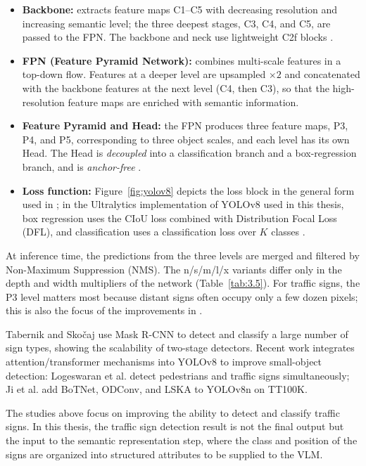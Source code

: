 \documentclass[12pt,a4paper]{report}
\begin{document}
\begin{itemize}
    \item \textbf{Backbone:} extracts feature maps C1--C5 with decreasing resolution and increasing semantic level; the three deepest stages, C3, C4, and C5, are passed to the FPN. The backbone and neck use lightweight C2f blocks \cite{sapkota2025yoloevolution}.
    \item \textbf{FPN (Feature Pyramid Network):} combines multi-scale features in a top-down flow. Features at a deeper level are upsampled $\times2$ and concatenated with the backbone features at the next level (C4, then C3), so that the high-resolution feature maps are enriched with semantic information.
    \item \textbf{Feature Pyramid and Head:} the FPN produces three feature maps, P3, P4, and P5, corresponding to three object scales, and each level has its own Head. The Head is \textit{decoupled} into a classification branch and a box-regression branch, and is \textit{anchor-free} \cite{sapkota2025yoloevolution}.
    \item \textbf{Loss function:} Figure~\ref{fig:yolov8} depicts the loss block in the general form used in \cite{sapkota2025yoloevolution}; in the Ultralytics implementation of YOLOv8 used in this thesis, box regression uses the CIoU loss combined with Distribution Focal Loss (DFL), and classification uses a classification loss over $K$ classes \cite{jocher2023yolov8}.
\end{itemize}

At inference time, the predictions from the three levels are merged and filtered by Non-Maximum Suppression (NMS). The n/s/m/l/x variants differ only in the depth and width multipliers of the network (Table~\ref{tab:3.5}). For traffic signs, the P3 level matters most because distant signs often occupy only a few dozen pixels; this is also the focus of the improvements in \cite{ji2024improvedyolov8}.

Tabernik and Sko{\v c}aj \cite{tabernik2020largescale} use Mask R-CNN to detect and classify a large number of sign types, showing the scalability of two-stage detectors. Recent work integrates attention/transformer mechanisms into YOLOv8 to improve small-object detection: Logeswaran et al. \cite{logeswaran2024pedestrian} detect pedestrians and traffic signs simultaneously; Ji et al. \cite{ji2024improvedyolov8} add BoTNet, ODConv, and LSKA to YOLOv8n on TT100K.

The studies above focus on improving the ability to detect and classify traffic signs. In this thesis, the traffic sign detection result is not the final output but the input to the semantic representation step, where the class and position of the signs are organized into structured attributes to be supplied to the VLM.
\end{document}
